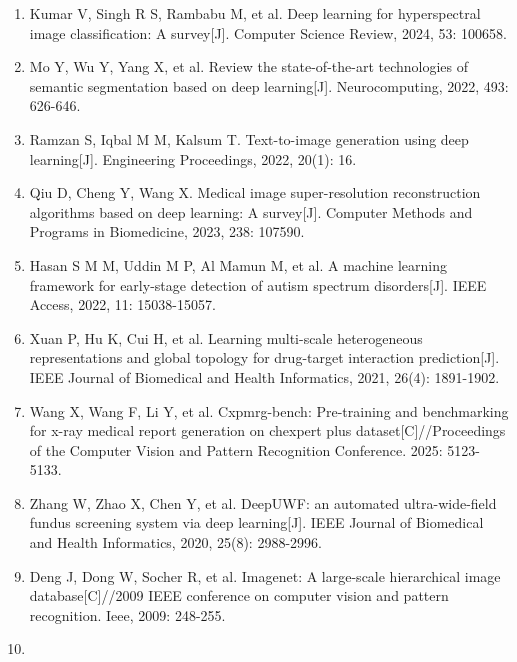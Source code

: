 \begin{enumerate}
\def\labelenumi{\arabic{enumi}.}
\item
  \protect{}\label{_Ref213871637}{}Kumar V, Singh R S, Rambabu M, et al. Deep learning for hyperspectral image classification: A survey{[}J{]}. Computer Science Review, 2024, 53: 100658.
\item
  \protect{}\label{_Ref213948625}{}Mo Y, Wu Y, Yang X, et al. Review the state-of-the-art technologies of semantic segmentation based on deep learning{[}J{]}. Neurocomputing, 2022, 493: 626-646.
\item
  \protect{}\label{_Ref213948646}{}Ramzan S, Iqbal M M, Kalsum T. Text-to-image generation using deep learning{[}J{]}. Engineering Proceedings, 2022, 20(1): 16.
\item
  \protect{}\label{_Ref213948898}{}Qiu D, Cheng Y, Wang X. Medical image super-resolution reconstruction algorithms based on deep learning: A survey{[}J{]}. Computer Methods and Programs in Biomedicine, 2023, 238: 107590.
\item
  \protect{}\label{_Ref213949262}{}Hasan S M M, Uddin M P, Al Mamun M, et al. A machine learning framework for early-stage detection of autism spectrum disorders{[}J{]}. IEEE Access, 2022, 11: 15038-15057.
\item
  \protect{}\label{_Ref213949290}{}Xuan P, Hu K, Cui H, et al. Learning multi-scale heterogeneous representations and global topology for drug-target interaction prediction{[}J{]}. IEEE Journal of Biomedical and Health Informatics, 2021, 26(4): 1891-1902.
\item
  \protect{}\label{_Ref213949294}{}Wang X, Wang F, Li Y, et al. Cxpmrg-bench: Pre-training and benchmarking for x-ray medical report generation on chexpert plus dataset{[}C{]}//Proceedings of the Computer Vision and Pattern Recognition Conference. 2025: 5123-5133.
\item
  \protect{}\label{_Ref213949315}{}Zhang W, Zhao X, Chen Y, et al. DeepUWF: an automated ultra-wide-field fundus screening system via deep learning{[}J{]}. IEEE Journal of Biomedical and Health Informatics, 2020, 25(8): 2988-2996.
\item
  \protect{}\label{_Ref213949336}{}Deng J, Dong W, Socher R, et al. Imagenet: A large-scale hierarchical image database{[}C{]}//2009 IEEE conference on computer vision and pattern recognition. Ieee, 2009: 248-255.
\item

\end{enumerate}
